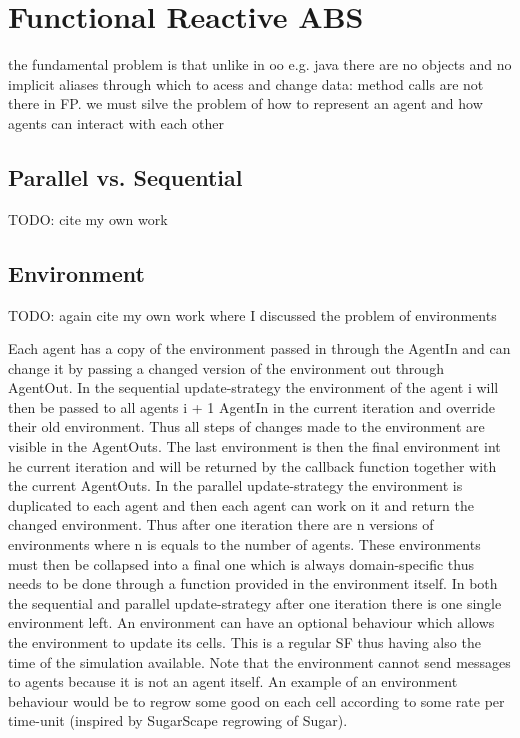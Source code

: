 \section{Functional Reactive ABS}
the fundamental problem is that unlike in oo e.g. java there are no objects and no implicit aliases through which to acess and change data: method calls are not there in FP. we must silve the problem of how to represent an agent and how agents can interact with each other

\subsection{Parallel vs. Sequential}
TODO: cite my own work

\subsection{Environment}
TODO: again cite my own work where I discussed the problem of environments

Each agent has a copy of the environment passed in through the AgentIn and can change it by passing a changed version of the environment out through AgentOut. 
In the sequential update-strategy the environment of the agent i will then be passed to all agents i + 1 AgentIn in the current iteration and override their old environment. Thus all steps of changes made to the environment are visible in the AgentOuts. The last environment is then the final environment int he current iteration and will be returned by the callback function together with the current AgentOuts.
In the parallel update-strategy the environment is duplicated to each agent and then each agent can work on it and return the changed environment. Thus after one iteration there are n versions of environments where n is equals to the number of agents. These environments must then be collapsed into a final one which is always domain-specific thus needs to be done through a function provided in the environment itself.
In both the sequential and parallel update-strategy after one iteration there is one single environment left. An environment can have an optional behaviour which allows the environment to update its cells. This is a regular SF thus having also the time of the simulation available. Note that the environment cannot send messages to agents because it is not an agent itself. An example of an environment behaviour would be to regrow some good on each cell according to some rate per time-unit (inspired by SugarScape regrowing of Sugar).


